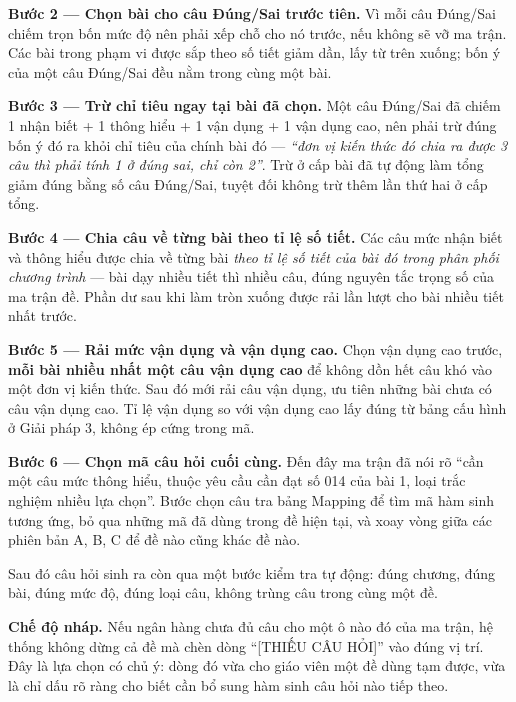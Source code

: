 \textbf{Bước 2 --- Chọn bài cho câu Đúng/Sai trước tiên.} Vì mỗi câu Đúng/Sai
chiếm trọn bốn mức độ nên phải xếp chỗ cho nó trước, nếu không sẽ vỡ ma trận.
Các bài trong phạm vi được sắp theo số tiết giảm dần, lấy từ trên xuống; bốn ý
của một câu Đúng/Sai đều nằm trong cùng một bài.

\textbf{Bước 3 --- Trừ chỉ tiêu ngay tại bài đã chọn.} Một câu Đúng/Sai đã
chiếm 1 nhận biết + 1 thông hiểu + 1 vận dụng + 1 vận dụng cao, nên phải trừ
đúng bốn ý đó ra khỏi chỉ tiêu của chính bài đó --- \textit{``đơn vị kiến thức
đó chia ra được 3 câu thì phải tính 1 ở đúng sai, chỉ còn 2''}. Trừ ở cấp bài
đã tự động làm tổng giảm đúng bằng số câu Đúng/Sai, tuyệt đối không trừ thêm
lần thứ hai ở cấp tổng.

\textbf{Bước 4 --- Chia câu về từng bài theo tỉ lệ số tiết.} Các câu mức nhận
biết và thông hiểu được chia về từng bài \textit{theo tỉ lệ số tiết của bài đó
trong phân phối chương trình} --- bài dạy nhiều tiết thì nhiều câu, đúng
nguyên tắc trọng số của ma trận đề. Phần dư sau khi làm tròn xuống được rải
lần lượt cho bài nhiều tiết nhất trước.

\textbf{Bước 5 --- Rải mức vận dụng và vận dụng cao.} Chọn vận dụng cao trước,
\textbf{mỗi bài nhiều nhất một câu vận dụng cao} để không dồn hết câu khó vào
một đơn vị kiến thức. Sau đó mới rải câu vận dụng, ưu tiên những bài chưa có
câu vận dụng cao. Tỉ lệ vận dụng so với vận dụng cao lấy đúng từ bảng cấu hình
ở Giải pháp 3, không ép cứng trong mã.

\textbf{Bước 6 --- Chọn mã câu hỏi cuối cùng.} Đến đây ma trận đã nói rõ ``cần
một câu mức thông hiểu, thuộc yêu cầu cần đạt số 014 của bài 1, loại trắc
nghiệm nhiều lựa chọn''. Bước chọn câu tra bảng Mapping để tìm mã hàm sinh
tương ứng, bỏ qua những mã đã dùng trong đề hiện tại, và xoay vòng giữa các
phiên bản A, B, C để đề nào cũng khác đề nào.

Sau đó câu hỏi sinh ra còn qua một bước kiểm tra tự động: đúng chương, đúng
bài, đúng mức độ, đúng loại câu, không trùng câu trong cùng một đề.

\textbf{Chế độ nháp.} Nếu ngân hàng chưa đủ câu cho một ô nào đó của ma trận,
hệ thống không dừng cả đề mà chèn dòng ``[THIẾU CÂU HỎI]'' vào đúng vị trí.
Đây là lựa chọn có chủ ý: dòng đó vừa cho giáo viên một đề dùng tạm được, vừa
là chỉ dấu rõ ràng cho biết cần bổ sung hàm sinh câu hỏi nào tiếp theo.


